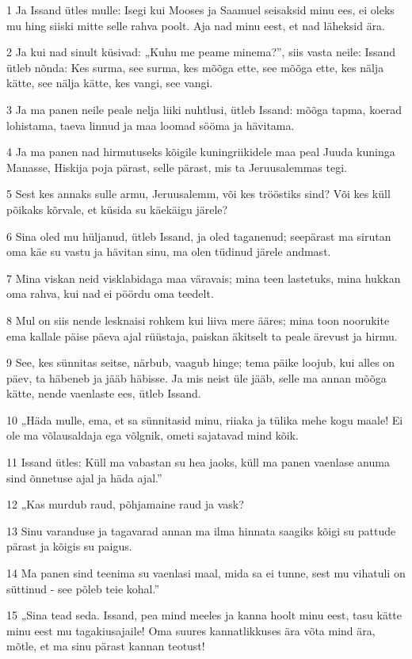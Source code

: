 \par 1 Ja Issand ütles mulle: Isegi kui Mooses ja Saamuel seisaksid minu ees, ei oleks mu hing siiski mitte selle rahva poolt. Aja nad minu eest, et nad läheksid ära.
\par 2 Ja kui nad sinult küsivad: „Kuhu me peame minema?”, siis vasta neile: Issand ütleb nõnda: Kes surma, see surma, kes mõõga ette, see mõõga ette, kes nälja kätte, see nälja kätte, kes vangi, see vangi.
\par 3 Ja ma panen neile peale nelja liiki nuhtlusi, ütleb Issand: mõõga tapma, koerad lohistama, taeva linnud ja maa loomad sööma ja hävitama.
\par 4 Ja ma panen nad hirmutuseks kõigile kuningriikidele maa peal Juuda kuninga Manasse, Hiskija poja pärast, selle pärast, mis ta Jeruusalemmas tegi.
\par 5 Sest kes annaks sulle armu, Jeruusalemm, või kes trööstiks sind? Või kes küll põikaks kõrvale, et küsida su käekäigu järele?
\par 6 Sina oled mu hüljanud, ütleb Issand, ja oled taganenud; seepärast ma sirutan oma käe su vastu ja hävitan sinu, ma olen tüdinud järele andmast.
\par 7 Mina viskan neid visklabidaga maa väravais; mina teen lastetuks, mina hukkan oma rahva, kui nad ei pöördu oma teedelt.
\par 8 Mul on siis nende lesknaisi rohkem kui liiva mere ääres; mina toon noorukite ema kallale päise päeva ajal rüüstaja, paiskan äkitselt ta peale ärevust ja hirmu.
\par 9 See, kes sünnitas seitse, närbub, vaagub hinge; tema päike loojub, kui alles on päev, ta häbeneb ja jääb häbisse. Ja mis neist üle jääb, selle ma annan mõõga kätte, nende vaenlaste ees, ütleb Issand.
\par 10 „Häda mulle, ema, et sa sünnitasid minu, riiaka ja tülika mehe kogu maale! Ei ole ma võlausaldaja ega võlgnik, ometi sajatavad mind kõik.
\par 11 Issand ütles: Küll ma vabastan su hea jaoks, küll ma panen vaenlase anuma sind õnnetuse ajal ja häda ajal.”
\par 12 „Kas murdub raud, põhjamaine raud ja vask?
\par 13 Sinu varanduse ja tagavarad annan ma ilma hinnata saagiks kõigi su pattude pärast ja kõigis su paigus.
\par 14 Ma panen sind teenima su vaenlasi maal, mida sa ei tunne, sest mu vihatuli on süttinud - see põleb teie kohal.”
\par 15 „Sina tead seda. Issand, pea mind meeles ja kanna hoolt minu eest, tasu kätte minu eest mu tagakiusajaile! Oma suures kannatlikkuses ära võta mind ära, mõtle, et ma sinu pärast kannan teotust!
